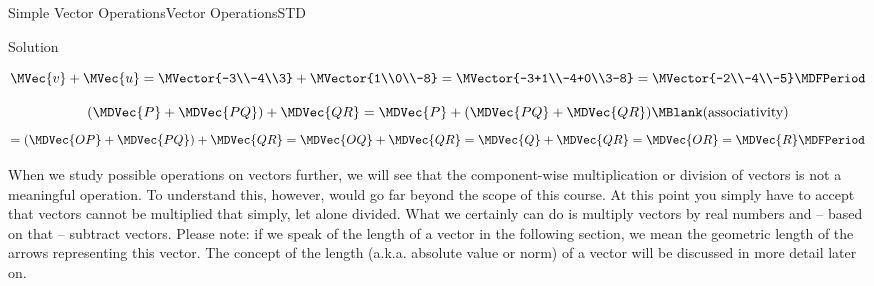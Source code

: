 \begin{MXContent}{Simple Vector Operations}{Vector Operations}{STD}
\begin{MExercise}
\begin{MHint}{Solution}
\begin{MExerciseItems}
\item{\[\MVec{v}+\MVec{u}=\MVector{-3\\-4\\3}+\MVector{1\\0\\-8} = \MVector{-3+1\\-4+0\\3-8} =\MVector{-2\\-4\\-5} \MDFPeriod\]} 
\item{\[ (\MDVec{P}+\MDVec{P Q})+\MDVec{Q R} = \MDVec{P}+(\MDVec{P Q}+\MDVec{Q R})\MBlank \textrm{(associativity)}\] \[= (\MDVec{O P}+\MDVec{P Q})+\MDVec{Q R} = \MDVec{O Q}+\MDVec{Q R} = \MDVec{Q}+\MDVec{Q R} = \MDVec{O R} = \MDVec{R} \MDFPeriod\]}
\end{MExerciseItems} 
\end{MHint}
\end{MExercise}


When we study possible operations on vectors further, we will see that the component-wise multiplication or division of vectors is not a 
meaningful operation. To understand this, however, would go far beyond the scope of this course. At this point you simply have  
to accept that vectors cannot be multiplied that simply, let alone divided. What we certainly can do 
is multiply vectors by real numbers and -- based on that -- subtract vectors. Please note: if we speak of the 
length of a vector in the following section, we mean the geometric length of the arrows representing this vector. The concept 
of the length (a.k.a. absolute value or norm) of a vector will be discussed in more detail later on.


\end{MXContent}
